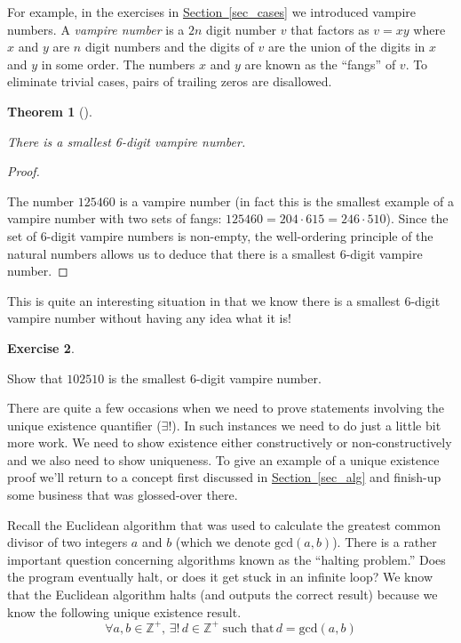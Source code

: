 \documentclass[10pt,]{book}
\theoremstyle{plain}
\newtheorem{theorem}{Theorem}[section]
\theoremstyle{definition}
\theoremstyle{definition}
\newtheorem{exercise}[theorem]{Exercise}
\numberwithin{equation}{section}
\renewcommand{\gcd}[2]{\mbox{gcd} (#1, #2)}
\newcommand{\Integers}{{\mathbb Z}}
\begin{document}
    For example, in the exercises in \hyperref[sec_cases]{Section~\ref{sec_cases}} we
    introduced vampire numbers. A  \emph{vampire number}
    is a
    \(2n\) digit number \(v\) that factors as \(v=xy\)
    where \(x\) and \(y\) are \(n\) digit numbers and the digits of \(v\) are the
    union of the digits in \(x\) and \(y\) in some order. The numbers \(x\) and \(y\)
    are known as the ``fangs'' of \(v\). To eliminate trivial
    cases, pairs of trailing zeros are disallowed.
\begin{theorem}[{}]\label{theorem-13}

        There is a smallest 6-digit vampire number.
\end{theorem}
\begin{proof}\hypertarget{proof-20}{}

      The number \(125460\) is a vampire number (in fact this is the smallest
      example of a vampire number with two sets of fangs:
      \(125460 = 204\cdot 615 = 246\cdot 510\)). Since the set of 6-digit vampire
      numbers is non-empty, the well-ordering principle of the natural numbers
      allows us to deduce that there is a smallest 6-digit vampire number.
\end{proof}
\par

    This is quite an interesting situation in that we know there is a smallest
    6-digit vampire number without having any idea what it is!
\begin{exercise}\label{exercise-27}

        Show that \(102510\) is the smallest 6-digit vampire number.
\end{exercise}
\par

    There are quite a few occasions when we need to prove statements
    involving the  unique existence quantifier
    (\(\exists !\)). In
    such instances we need to do just a little bit more work. We
    need to show existence \textemdash{} either constructively or non-constructively \textemdash{} and we also need to show uniqueness. To give an example of
    a unique existence proof we'll return to a concept first
    discussed in \hyperref[sec_alg]{Section~\ref{sec_alg}} and finish-up some business
    that was glossed-over there.
\par

    Recall the Euclidean algorithm that was used to calculate the
    greatest
    common divisor of two integers \(a\) and \(b\) (which we denote \(\gcd{a}{b}\)).
    There is a rather important question concerning algorithms known as
    the ``halting problem.'' Does the program eventually halt, or does it get
    stuck in an infinite loop? We know that the Euclidean algorithm halts
    (and outputs the correct result) because we know the following
    unique existence result.
    \begin{equation*}
      \forall a, b \in \Integers^+, \, \exists ! \, d \in \Integers^+ \; \mbox{such that}  \, d=\gcd{a}{b}
    \end{equation*}
\par
\end{document}
